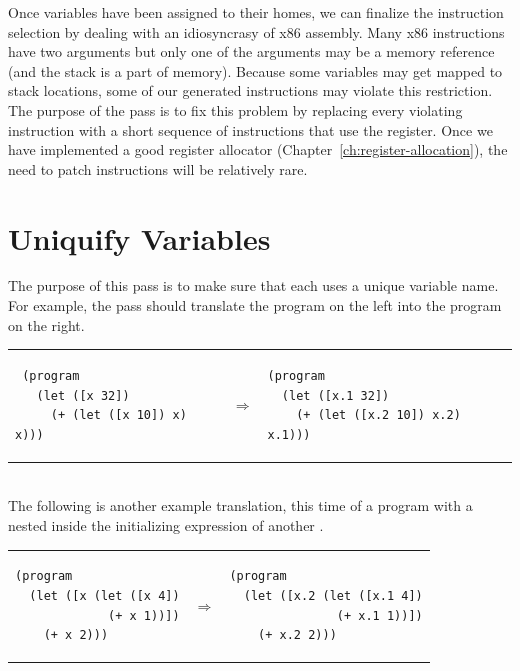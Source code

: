 \documentclass[11pt]{book}
\begin{document}
Once variables have been assigned to their homes, we can finalize the
instruction selection by dealing with an idiosyncrasy of x86
assembly. Many x86 instructions have two arguments but only one of the
arguments may be a memory reference (and the stack is a part of
memory).  Because some variables may get mapped to stack locations,
some of our generated instructions may violate this restriction.  The
purpose of the  pass is to fix this problem by
replacing every violating instruction with a short sequence of
instructions that use the  register. Once we have implemented
a good register allocator (Chapter~\ref{ch:register-allocation}), the
need to patch instructions will be relatively rare.


\section{Uniquify Variables}
\label{sec:uniquify-s0}

The purpose of this pass is to make sure that each  uses a
unique variable name. For example, the  pass should
translate the program on the left into the program on the right. \\
\begin{tabular}{lll}
\begin{minipage}{0.4\textwidth}
\begin{lstlisting}
 (program
   (let ([x 32])
     (+ (let ([x 10]) x) x)))
\end{lstlisting}
\end{minipage}
&
$\Rightarrow$
&
\begin{minipage}{0.4\textwidth}
\begin{lstlisting}
(program
  (let ([x.1 32])
    (+ (let ([x.2 10]) x.2) x.1)))
\end{lstlisting}
\end{minipage}
\end{tabular} \\
%
The following is another example translation, this time of a program
with a  nested inside the initializing expression of another
.\\
\begin{tabular}{lll}
\begin{minipage}{0.4\textwidth}
\begin{lstlisting}
(program
  (let ([x (let ([x 4])
             (+ x 1))])
    (+ x 2)))
\end{lstlisting}
\end{minipage}
&
$\Rightarrow$
&
\begin{minipage}{0.4\textwidth}
\begin{lstlisting}
(program
  (let ([x.2 (let ([x.1 4])
               (+ x.1 1))])
    (+ x.2 2)))
\end{lstlisting}
\end{minipage}
\end{tabular}
\end{document}
